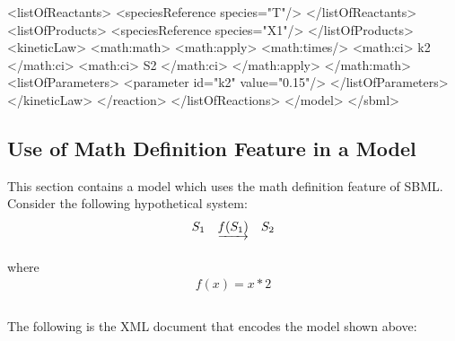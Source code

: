 \documentclass[10pt]{cekarticle}
\begin{document}
\begin{example}
                <listOfReactants>
                    <speciesReference species="T"/>
                </listOfReactants>
                <listOfProducts>
                    <speciesReference species="X1"/>
                </listOfProducts>
                <kineticLaw>
                    <math:math>
                        <math:apply>
                            <math:times/>
                            <math:ci> k2 </math:ci>
                            <math:ci> S2 </math:ci>
                        </math:apply>
                    </math:math>
                    <listOfParameters>
                        <parameter id="k2" value="0.15"/>
                    </listOfParameters>
                </kineticLaw>
            </reaction>
        </listOfReactions>
    </model>
</sbml>
\end{example}

\subsection{Use of Math Definition Feature in a Model}
\label{sec:functioneg}

This section contains a model which uses the math definition
feature of SBML.  Consider the following hypothetical system:
\begin{equation*}
  \begin{array}{@{}ccc@{}}
    S_1 & \underrightarrow{f(S_1)} & S_2 \\ \\[-4pt]
  \end{array}
\end{equation*}
where
\begin{equation*}
  \begin{array}{l}
    f(x) = x * 2 \\ \\[-4pt]
  \end{array}
\end{equation*}

The following is the XML document that encodes the model shown
above:
\end{document}
